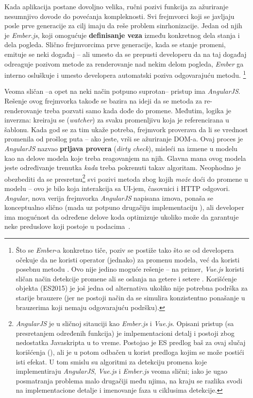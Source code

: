 Kada aplikacija postane dovoljno velika, ručni pozivi funkcija za ažuriranje nesumnjivo dovode do povećanja kompleknosti.
Svi frejmvorci koji se javljaju posle prve generacije za cilj imaju da reše problem sinrhonizacije.
Jedan od njih je \textsl{Ember.js}, koji omogućuje \textbf{definisanje veza} između konkretnog dela stanja i dela pogleda.
Slično frejmvorcima prve generacije, kada se stanje promeni, emituje se neki događaj -- ali umesto da se prepusti developeru da na taj događaj odreaguje pozivom metode za renderovanje nad nekim delom pogleda, \textsl{Ember} ga interno osluškuje i umesto developera automatski poziva odgovarajuću metodu.%
\footnote{Što se \textsl{Ember}-a konkretno tiče,  poziv se postiže tako što se od developera očekuje da ne koristi operator \code{=} (jednako) za promenu modela, već da koristi posebnu metodu . Ovo nije jedino moguće rešenje -- na primer, \textsl{Vue.js} koristi sličan način detekcije promene ali se oslanja na getere i setere \cite{matt:vue-code}. Korišćenje  objekta (ES2015) je još jedna od alternativa ukoliko nije potrebna podrška za starije brauzere (jer ne postoji način da se simulira konzistentno ponašanje u brauzerima koji nemaju odgovarajuću podršku).}

Veoma sličan --a opet na neki način potpuno suprotan-- pristup ima \textsl{AngularJS}.
Rešenje ovog frejmvorka takođe se bazira na ideji da se metoda za re-renderovanje treba pozvati samo kada dođe do promene.
Međutim, logika je inverzna: kreiraju se  (\textsl{watcher}) za svaku promenljivu koja je referencirana u šablonu.
Kada god se za tim ukaže potreba, frejmvork proverava da li se vrednost promenila od prošlog puta -- ako jeste, vrši se ažuriranje DOM-a.
Ovaj proces je \textsl{AngularJS} nazvao \textbf{prljava provera} (\textsl{dirty check}), misleći na izmene u modelu kao na  delove modela koje treba  reagovanjem na njih.
Glavna mana ovog modela jeste određivanje trenutka \emph{kada} treba pokrenuti takav algoritam.
Neophodno je obezbediti da se presretnu\footnote{\textsl{AngularJS} je u sličnoj sitauciji kao \textsl{Ember.js} i \textsl{Vue.js}. Opisani pristup (sa presretanjem određenih funkcija) je imlpementacioni detalj i postoji zbog nedostatka Javaskripta u to vreme. Postojao je ES predlog baš za ovaj slučaj korišćenja (), ali je u potom odbačen u korist predloga  kojim se može postići isti efekat. U tom smislu su algoritmi za detekciju promena koje implementiraju \textsl{AngularJS}, \textsl{Vue.js} i \textsl{Ember.js} veoma slični; iako je ugao posmatranja problema malo drugačiji među njima, na kraju se razlika svodi na implementacione detalje i imenovanje faza u ciklusima detekcije.} svi pozivi metoda zbog kojih \textit{može} doći do promene u modelu -- ovo je bilo koja interakcija sa UI-jem, časovnici i HTTP odgovori.
\textsl{Angular}, nova verija frejmvorka \textsl{AngularJS} napisana iznova, ponaša se konceptualno slično (mada uz potpuno drugačiju implementaciju \cite{ng-uni:cd, milosz:ng-cd}), ali developer ima mogućnost da određene delove koda optimizuje ukoliko može da garantuje neke preduslove koji postoje u podacima~\cite{savkin:cd, thoughtram:cd}.

